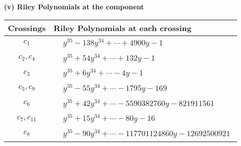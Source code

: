 \documentclass[1p]{elsarticle_modified}
\theoremstyle{definition}
\begin{document}
\newpage\renewcommand{\arraystretch}{1}
\flushleft \textbf{(v) Riley Polynomials at the component}\newline \\
\begin{tabular}{m{50pt}|m{274pt}}
Crossings & \hspace{64pt}Riley Polynomials at each crossing \\
\hline $$\begin{aligned}c_{1}\end{aligned}$$&$\begin{aligned}
&y^{35}-138 y^{34}+\cdots+4900 y-1
\end{aligned}$\\
\hline $$\begin{aligned}c_{2},c_{4}\end{aligned}$$&$\begin{aligned}
&y^{35}+54 y^{34}+\cdots+132 y-1
\end{aligned}$\\
\hline $$\begin{aligned}c_{3}\end{aligned}$$&$\begin{aligned}
&y^{35}+6 y^{34}+\cdots-4 y-1
\end{aligned}$\\
\hline $$\begin{aligned}c_{5},c_{9}\end{aligned}$$&$\begin{aligned}
&y^{35}-55 y^{34}+\cdots-1795 y-169
\end{aligned}$\\
\hline $$\begin{aligned}c_{6}\end{aligned}$$&$\begin{aligned}
&y^{35}+42 y^{34}+\cdots-5590382760 y-821911561
\end{aligned}$\\
\hline $$\begin{aligned}c_{7},c_{11}\end{aligned}$$&$\begin{aligned}
&y^{35}+15 y^{34}+\cdots-80 y-16
\end{aligned}$\\
\hline $$\begin{aligned}c_{8}\end{aligned}$$&$\begin{aligned}
&y^{35}-90 y^{34}+\cdots-117701124860 y-12692500921
\end{aligned}$\\

\end{tabular}
\end{document}
